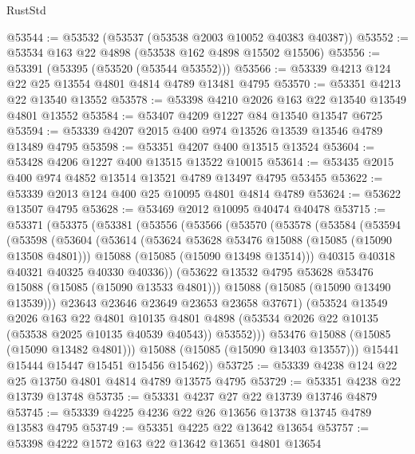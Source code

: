 \begin{lexlean}{RustStd}
\begin{coremodule}
@53544 := @53532 (@53537 (@53538 @2003 @10052 @40383 @40387))
@53552 := @53534 @163 @22 @4898 (@53538 @162 @4898 @15502 @15506)
@53556 := @53391 (@53395 (@53520 (@53544 @53552)))
@53566 := @53339 @4213 @124 @22 @25 @13554 @4801 @4814 @4789 @13481 @4795
@53570 := @53351 @4213 @22 @13540 @13552
@53578 := @53398 @4210 @2026 @163 @22 @13540 @13549 @4801 @13552
@53584 := @53407 @4209 @1227 @84 @13540 @13547 @6725
@53594 := @53339 @4207 @2015 @400 @974 @13526 @13539 @13546 @4789 @13489 @4795
@53598 := @53351 @4207 @400 @13515 @13524
@53604 := @53428 @4206 @1227 @400 @13515 @13522 @10015
@53614 := @53435 @2015 @400 @974 @4852 @13514 @13521 @4789 @13497 @4795 @53455
@53622 := @53339 @2013 @124 @400 @25 @10095 @4801 @4814 @4789
@53624 := @53622 @13507 @4795
@53628 := @53469 @2012 @10095 @40474 @40478
@53715 := @53371
    (@53375
      (@53381
        (@53556
          (@53566
            (@53570
              (@53578
                (@53584
                  (@53594
                    (@53598
                      (@53604
                        (@53614
                          (@53624 @53628 @53476 @15088 (@15085 (@15090 @13508 @4801)))
                          @15088
                          (@15085 (@15090 @13498 @13514)))
                        @40315
                        @40318
                        @40321
                        @40325
                        @40330
                        @40336))
                    (@53622 @13532 @4795 @53628 @53476 @15088 (@15085 (@15090 @13533 @4801)))
                    @15088
                    (@15085 (@15090 @13490 @13539)))
                  @23643
                  @23646
                  @23649
                  @23653
                  @23658
                  @37671)
                (@53524
                  @13549
                  @2026
                  @163
                  @22
                  @4801
                  @10135
                  @4801
                  @4898
                  (@53534 @2026 @22 @10135 (@53538 @2025 @10135 @40539 @40543))
                  @53552)))
            @53476
            @15088
            (@15085 (@15090 @13482 @4801)))
          @15088
          (@15085 (@15090 @13403 @13557)))
        @15441
        @15444
        @15447
        @15451
        @15456
        @15462))
@53725 := @53339 @4238 @124 @22 @25 @13750 @4801 @4814 @4789 @13575 @4795
@53729 := @53351 @4238 @22 @13739 @13748
@53735 := @53331 @4237 @27 @22 @13739 @13746 @4879
@53745 := @53339 @4225 @4236 @22 @26 @13656 @13738 @13745 @4789 @13583 @4795
@53749 := @53351 @4225 @22 @13642 @13654
@53757 := @53398 @4222 @1572 @163 @22 @13642 @13651 @4801 @13654

\end{coremodule}
\end{lexlean}
